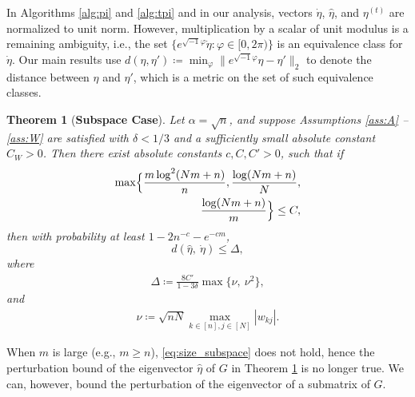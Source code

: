 \documentclass[11pt,journal]{IEEEtran}
\newcommand{\norm}[1]{\|{#1}\|}
\newtheorem{theorem}{Theorem}[section]
\begin{document}
In Algorithms \ref{alg:pi} and \ref{alg:tpi} and in our analysis, vectors $\dot{\eta}$, $\hat{\eta}$, and $\eta^{(t)}$ are normalized to unit norm. However, multiplication by a scalar of unit modulus is a remaining ambiguity, i.e., the set $\{e^{\sqrt{-1}\varphi}\dot{\eta}: \varphi \in [0,2\pi)\}$ is an equivalence class for $\dot{\eta}$. Our main results use $d(\eta,\eta') \coloneqq \min_\varphi \norm{e^{\sqrt{-1}\varphi}\eta - \eta'}_2$ to denote the distance between $\eta$ and $\eta'$, which is a metric on the set of such equivalence classes.


\begin{theorem}[\textbf{Subspace Case}] \label{thm:perturbation}
Let $\alpha =\sqrt{n}$, and suppose Assumptions \ref{ass:A} -- \ref{ass:W} are satisfied with $\delta < 1/3$ and a sufficiently small absolute constant $C_W > 0$. 
Then there exist absolute constants $c,C,C' > 0$, such that if
\begin{align}
\max\Bigl\{\frac{m\log^2(Nm+n)}{n}, \frac{\log(Nm+n)}{N},  \nonumber\\
\frac{\log(Nm+n)}{m} \Bigr\} \leq C,  \label{eq:size_subspace}
\end{align}
then with probability at least $1-2n^{-c} - e^{-cm}$,
\[
d(\hat{\eta},~\dot{\eta}) \leq \Delta,
\]
where
\begin{align}
\Delta \coloneqq
\frac{8C'}{1-3\delta} \max\{\nu,~\nu^2\},  \label{eq:Delta}
\end{align}
and
\begin{align}
\nu \coloneqq \sqrt{nN} \max_{k\in[n], j\in[N]}|w_{kj}|. \label{eq:nu}
\end{align}
\end{theorem}





When $m$ is large (e.g., $m\geq n$), \eqref{eq:size_subspace} does not hold, hence the perturbation bound of the eigenvector $\hat{\eta}$ of $G$ in Theorem \ref{thm:perturbation} is no longer true. We can, however, bound the perturbation of the eigenvector of a submatrix of $G$. 
\end{document}
